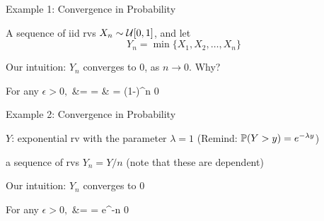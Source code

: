 \begin{frame}{Example 1: Convergence in Probability}


\plitemsep 0.1in

\bci

\item<2-> A sequence of iid rvs $X_n \sim \mathcal U[0,1]$, and let
$$
Y_n = \min\{X_1, X_2, \ldots, X_n \}
$$

\item<3-> Our intuition: $Y_n$ converges to 0, as $n \rightarrow 0.$ Why?

\item<4-> \proff For any $\epsilon >0,$
\aleq
{
 &= 
=  \times \cdots \times {} \cr
& = (1-\epsilon)^n  0
}

\eci
\end{frame}

\begin{frame}{Example 2: Convergence in Probability}


\plitemsep 0.1in

\bci

\item<2-> $Y$: exponential rv with the parameter $\lambda =1$ (Remind: $\mathbb{P}( Y > y  ) = e^{-\lambda y}$)

\item<2-> a sequence of rvs $Y_n = Y/n$ (note that these are dependent)

\item<3-> Our intuition: $Y_n$ converges to 0

\item<4-> \proff For any $\epsilon >0,$
\aleq
{
 &=  = e^{-n\epsilon}  0
}

\eci
\end{frame}

